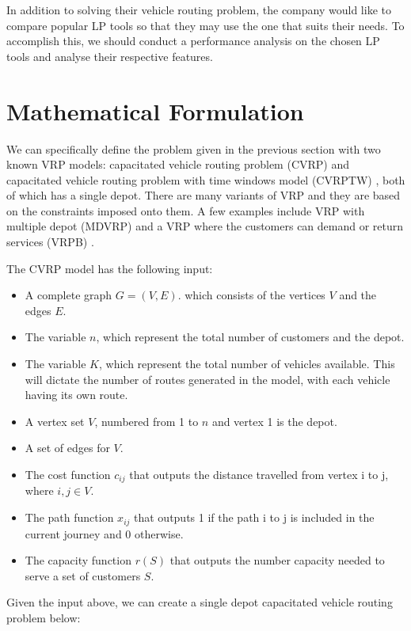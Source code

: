 In addition to solving their vehicle routing problem,  the company would like to compare popular LP tools
 so that they may use the one that suits their needs. To accomplish this, we should conduct a performance analysis on the chosen LP tools
and analyse their respective features.

\section{Mathematical Formulation}
We can specifically define the problem given in the previous section with two known VRP models: capacitated
vehicle routing problem (CVRP) \cite{Daneshzand2011} and capacitated vehicle routing problem
with time windows model (CVRPTW) \cite{Daneshzand2011, Desrochers1988}, both of which has a single depot.
There are many variants of VRP and they are based
 on the constraints imposed onto them. A few examples include VRP with multiple depot (MDVRP) \cite{Daneshzand2011} and a VRP where the
 customers can demand or return services (VRPB) \cite{Daneshzand2011}.

The CVRP model has the following input:
\begin{itemize}
\item A complete graph \(G = (V, E)\). which consists of the vertices \(V\) and the edges \(E\).
\item The variable \(n\), which represent the total number of customers and the depot.
\item The variable \(K\), which represent the total number of vehicles available. This will dictate the number of routes
generated in the model, with each vehicle having its own route.
\item A vertex set \(V\), numbered from 1 to \(n\) and vertex 1 is the depot.
\item A set of edges for \(V\).
\item The cost function \(c_{ij}\) that outputs the distance travelled from vertex i to j, where \(i,j \in V\).
\item The path function \(x_{ij}\) that outputs 1 if the path i to j is included in the current journey and 0 otherwise.
\item The capacity function \(r(S)\) that outputs the number capacity needed to serve a set of customers \(S\).
\end{itemize}

Given the input above, we can create a single depot capacitated vehicle routing problem below:

\vspace{0.5cm}

